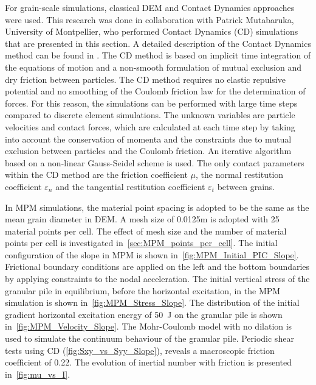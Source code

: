 For grain-scale simulations, classical DEM and Contact Dynamics approaches were 
used. This research was done in collaboration with Patrick Mutabaruka, 
University of Montpellier, who performed Contact Dynamics (CD) simulations that 
are presented in this section. A detailed description of the Contact Dynamics 
method can be found in \cite{Moreau1993,Jean1999,Radjai2009,Radjai2011}. 
The CD method is based on implicit time integration of the equations of motion 
and a non-smooth formulation of mutual exclusion and dry friction between 
particles. The CD method requires no elastic repulsive potential and no 
smoothing of the Coulomb friction law for the determination of forces. 
For this reason, the simulations can be performed with large time steps 
compared to discrete element simulations. The unknown variables are particle 
velocities and contact forces, which are calculated at each time step by taking 
into account the conservation of momenta and the constraints due to mutual 
exclusion between particles and the Coulomb friction. An iterative 
algorithm based on a non-linear Gauss-Seidel scheme is used. The only 
contact parameters within the CD method are the friction coefficient $\mu$, the 
normal restitution coefficient $\varepsilon_n$ and the tangential restitution 
coefficient $\varepsilon_t$ between grains. 

In MPM simulations, the material point spacing is adopted to be the same as the 
mean grain diameter in DEM. A mesh size of 0.0125m is adopted with 25 material 
points per cell. The effect of mesh size and the number of material points per 
cell is investigated in~\cref{sec:MPM_points_per_cell}. The initial 
configuration of the slope in MPM is shown in~\cref{fig:MPM_Initial_PIC_Slope}. 
Frictional boundary conditions are applied on the left and the bottom 
boundaries by applying constraints to the nodal acceleration. The initial 
vertical stress of the granular pile in equilibrium, before the horizontal 
excitation, in the MPM simulation is shown in~\cref{fig:MPM_Stress_Slope}. The 
distribution of the initial gradient horizontal excitation energy of 50~\si{J} 
on the granular pile is shown in~\cref{fig:MPM_Velocity_Slope}. The 
Mohr-Coulomb model with no dilation is used to simulate the continuum behaviour 
of the granular pile. Periodic shear tests using CD 
(\cref{fig:Sxy_vs_Syy_Slope}), reveals a macroscopic friction coefficient of 
0.22. The evolution of inertial number with friction is presented 
in~\cref{fig:mu_vs_I}. 

